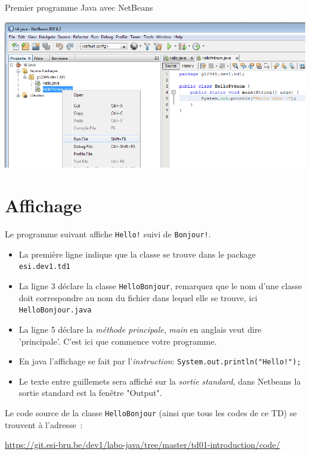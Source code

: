 \documentclass[a4paper,11pt]{article}
\newcommand{\publicbasepath}{https://git.esi-bru.be/dev1/labo-java/tree/master/td01-introduction}
\renewcommand{\listingpublicpath}{\publicbasepath/code/}
\begin{document}
\begin{Tutoriel}{Premier programme Java avec NetBeans}
\begin{steps}
		\begin{center}
			\includegraphics[width=.9\textwidth]{images/nb_newproject_run_othermain}
		\end{center}

	\end{steps}

	\end{Tutoriel}

\section{Affichage}

	Le programme suivant affiche \texttt{Hello!} suivi de \texttt{Bonjour!}.

	\begin{itemize}
		\item La première ligne indique que la classe se trouve dans le package \texttt{esi.dev1.td1}
		\item La ligne 3 déclare la classe \texttt{HelloBonjour}, remarquez que le nom d'une classe 
			doit correspondre au nom du fichier dans lequel elle se trouve, ici \texttt{HelloBonjour.java}
		\item La ligne 5 déclare la \emph{méthode principale}, \emph{main} en anglais veut dire 'principale'.
			C'est ici que commence votre programme.
		\item En java l'affichage se fait par l'\emph{instruction}: \texttt{System.out.println("Hello!");}
		\item Le texte entre guillemets sera affiché sur la \emph{sortie standard}, dans Netbeans la
		sortie standard est la fenêtre "Output".
	\end{itemize}

	Le code source de la classe \texttt{HelloBonjour} (ainsi que tous les codes de ce TD) se trouvent à l'adresse~: 
	
	\url{\listingpublicpath}
	
\end{document}
